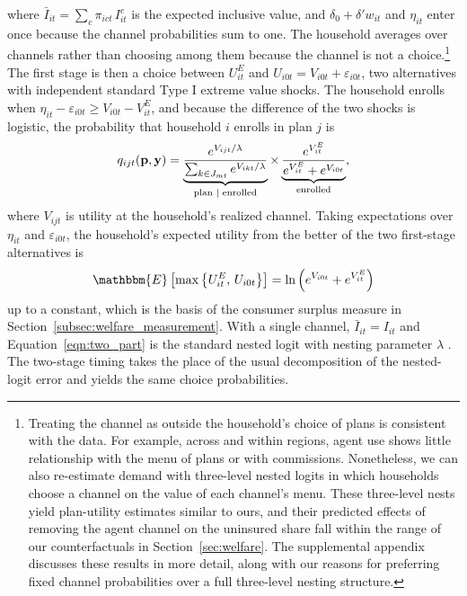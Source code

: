 \documentclass[12pt]{article}
\begin{document}
where $\bar{I}_{it} = \sum_c \pi_{ict}\, I^c_{it}$ is the expected inclusive value, and $\delta_0 + \delta' w_{it}$ and $\eta_{it}$ enter once because the channel probabilities sum to one. The household averages over channels rather than choosing among them because the channel is not a choice.\footnote{Treating the channel as outside the household's choice of plans is consistent with the data. For example, across and within regions, agent use shows little relationship with the menu of plans or with commissions. Nonetheless, we can also re-estimate demand with three-level nested logits in which households choose a channel on the value of each channel's menu. These three-level nests yield plan-utility estimates similar to ours, and their predicted effects of removing the agent channel on the uninsured share fall within the range of our counterfactuals in Section~\ref{sec:welfare}. The supplemental appendix discusses these results in more detail, along with our reasons for preferring fixed channel probabilities over a full three-level nesting structure.} The first stage is then a choice between $U^E_{it}$ and $U_{i0t} = V_{i0t} + \varepsilon_{i0t}$, two alternatives with independent standard Type I extreme value shocks. The household enrolls when $\eta_{it} - \varepsilon_{i0t} \geq V_{i0t} - V^E_{it}$, and because the difference of the two shocks is logistic, the probability that household $i$ enrolls in plan $j$ is
\begin{equation}
\label{eqn:two_part}
	q_{ijt}({\bf p},{\bf y}) = \underbrace{\frac{e^{V_{ijt}/\lambda}}{\sum_{k \in J_{mt}} e^{V_{ikt}/\lambda}}}_{\text{plan } \mid \text{ enrolled}} \times \underbrace{\frac{e^{V^E_{it}}}{e^{V^E_{it}} + e^{V_{i0t}}}}_{\text{enrolled}},
\end{equation}
where $V_{ijt}$ is utility at the household's realized channel. Taking expectations over $\eta_{it}$ and $\varepsilon_{i0t}$, the household's expected utility from the better of the two first-stage alternatives is
\begin{equation}
\label{eqn:market_value}
	\mathbbm{E}\left[\max\left\{U^E_{it},\, U_{i0t}\right\}\right] = \ln\left(e^{V_{i0t}} + e^{V^E_{it}}\right)
\end{equation}
up to a constant, which is the basis of the consumer surplus measure in Section~\ref{subsec:welfare_measurement}. With a single channel, $\bar{I}_{it} = I_{it}$ and Equation~\eqref{eqn:two_part} is the standard nested logit with nesting parameter $\lambda$ \citep{train_discrete_2009}. The two-stage timing takes the place of the usual decomposition of the nested-logit error \citep{cardell_variance_1997} and yields the same choice probabilities.
\end{document}
